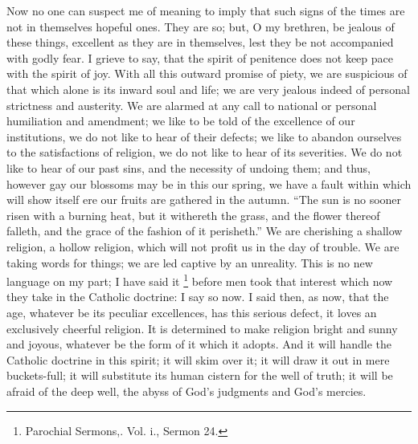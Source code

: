 Now no one can suspect me of meaning to imply that such signs of
the times are not in themselves hopeful ones. They are so; but, O my
brethren, be jealous of these things, excellent as they are in
themselves, lest they be not accompanied with godly fear. I grieve to
say, that the spirit of penitence does not keep pace with the spirit
of joy. With all this outward promise of piety, we are suspicious of
that which alone is its inward soul and life; we are very jealous
indeed of personal strictness and austerity. We are alarmed at any
call to national or personal humiliation and amendment; we like to be
told of the excellence of our institutions, we do not like to hear of
their defects; we like to abandon ourselves to the satisfactions of
religion, we do not like to hear of its severities. We do not like to
hear of our past sins, and the necessity of undoing them; and thus,
however gay our blossoms may be in this our spring, we have a fault
within which will show itself ere our fruits are gathered in the
autumn. ``The sun is no sooner risen with a burning heat, but it
withereth the grass, and the flower thereof falleth, and the grace of
the fashion of it perisheth.'' We are cherishing a shallow
religion, a hollow religion, which will not profit us in the day of
trouble. We are taking words for things; we are led captive by an
unreality. This is no new language on my part; I have said it \footnote{Parochial Sermons,. Vol. i., Sermon
24.} before men took that interest which now they take in the
Catholic doctrine: I say so now. I said then, as now, that the age,
whatever be its peculiar excellences, has this serious defect, it
loves an exclusively cheerful religion. It is determined to make
religion bright and sunny and joyous, whatever be the form of it which
it adopts. And it will handle the Catholic doctrine in this spirit; it
will skim over it; it will draw it out in mere buckets-full; it will
substitute its human cistern for the well of truth; it will be afraid
of the deep well, the abyss of God's judgments and God's mercies.

